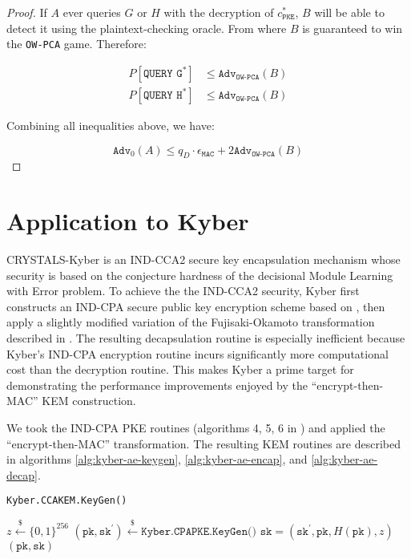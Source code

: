\documentclass[floatrow,journal=tches,submission]{iacrtrans}
\newcommand{\pke}{\texttt{PKE}}
\newcommand{\mac}{\texttt{MAC}}
\newcommand{\pk}{\texttt{pk}}
\newcommand{\sk}{\texttt{sk}}
\newcommand{\leftsample}{\stackrel{\$}{\leftarrow}}
\begin{document}
\begin{proof}
    If $A$ ever queries $G$ or $H$ with the decryption of $c^\ast_\pke$, $B$ will be able to detect it using the plaintext-checking oracle. From where $B$ is guaranteed to win the \texttt{OW-PCA} game. Therefore:

    \begin{equation*}
        \begin{aligned}
            P[\texttt{QUERY G}^\ast] &\leq \texttt{Adv}_\texttt{OW-PCA}(B) \\
            P[\texttt{QUERY H}^\ast] &\leq \texttt{Adv}_\texttt{OW-PCA}(B)
        \end{aligned}
    \end{equation*}

    Combining all inequalities above, we have:

    \begin{equation*}
        \texttt{Adv}_0(A) \leq q_D \cdot \epsilon_\mac + 2 \texttt{Adv}_\texttt{OW-PCA}(B)
    \end{equation*}
\end{proof}

\section{Application to Kyber}\label{sec:experimental-results}
CRYSTALS-Kyber \cite{bos2018crystals}\cite{avanzi2019crystals} is an IND-CCA2 secure key encapsulation mechanism whose security is based on the conjecture hardness of the decisional Module Learning with Error problem. To achieve the the IND-CCA2 security, Kyber first constructs an IND-CPA secure public key encryption scheme based on \cite{lpr2013ideal}, then apply a slightly modified variation of the Fujisaki-Okamoto transformation described in \cite{hofheinz2017modular}. The resulting decapsulation routine is especially inefficient because Kyber's IND-CPA encryption routine incurs significantly more computational cost than the decryption routine. This makes Kyber a prime target for demonstrating the performance improvements enjoyed by the ``encrypt-then-MAC'' KEM construction.

We took the IND-CPA PKE routines (algorithms 4, 5, 6 in \cite{avanzi2019crystals}) and applied the ``encrypt-then-MAC'' transformation. The resulting KEM routines are described in algorithms \ref{alg:kyber-ae-keygen}, \ref{alg:kyber-ae-encap}, and \ref{alg:kyber-ae-decap}.

\begin{algorithm}[H]
    \caption{\texttt{Kyber.CCAKEM.KeyGen()}}\label{alg:kyber-ae-keygen}
    \begin{algorithmic}[1]
        \State $z \leftsample \{0,1\}^{256}$
        \State $(\pk, \sk^\prime) \leftsample \texttt{Kyber.CPAPKE.KeyGen()}$
        \State $\sk = (\sk^\prime, \pk, H(\pk), z)$
        \State \Return $(\pk, \sk)$
    \end{algorithmic}
\end{algorithm}
\end{document}
